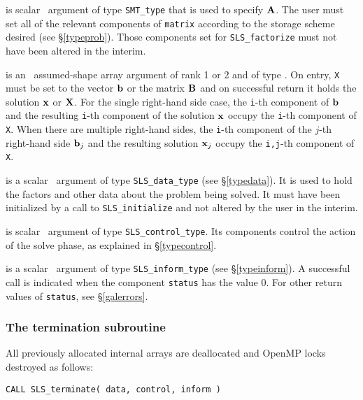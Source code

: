 \documentclass{galahad}
\newcommand{\packagename}{SLS}
\begin{document}
\begin{description}

 is scalar \intentin\ argument of type {\tt SMT\_type}
that is used to specify ${\mathbf{A}}$.
The user must set all of the relevant components of {\tt matrix} according
to the storage scheme desired (see \S\ref{typeprob}). Those components
set for {\tt \packagename\_factorize} must not have been altered in the interim.

 is an \intentinout\ assumed-shape array argument of rank 1 or 2
and of type \realdp.  On entry, {\tt X} must be set
to the vector ${\mathbf{b}}$ or the matrix ${\mathbf{B}}$ and on successful return it holds
the solution ${\mathbf{x}}$ or ${\mathbf{X}}$. For the single right-hand side case, the
{\tt i}-th component of ${\mathbf{b}}$ and the resulting
{\tt i}-th component of the solution ${\mathbf{x}}$
occupy the {\tt i}-th component of {\tt X}. When there are multiple
right-hand sides, the
{\tt i}-th component of the $j$-th right-hand side ${\mathbf{b}}_j$
and the resulting solution ${\mathbf{x}}_j$ occupy the
{\tt i,j}-th component of {\tt X}.

 is a scalar \intentinout\ argument of type
{\tt \packagename\_data\_type}
(see \S\ref{typedata}). It is used to hold the factors and other
data about the problem being solved.
It must have been initialized by a call to
{\tt \packagename\_ini\-tialize} and not altered by the user in the interim.

 is scalar \intentin\ argument of type
{\tt \packagename\_control\_type}. Its components control the action
of the solve phase, as explained in
\S\ref{typecontrol}.

 is a scalar \intentinout\ argument of type
{\tt \packagename\_inform\_type}
(see \S\ref{typeinform}).
A successful call is indicated when the  component {\tt status} has the value 0.
For other return values of {\tt status}, see \S\ref{galerrors}.

\end{description}


\subsubsection{The termination subroutine}
All previously allocated internal arrays are deallocated and OpenMP locks
destroyed as follows:

\hskip0.5in
{\tt CALL \packagename\_terminate( data, control, inform )}
\end{document}
